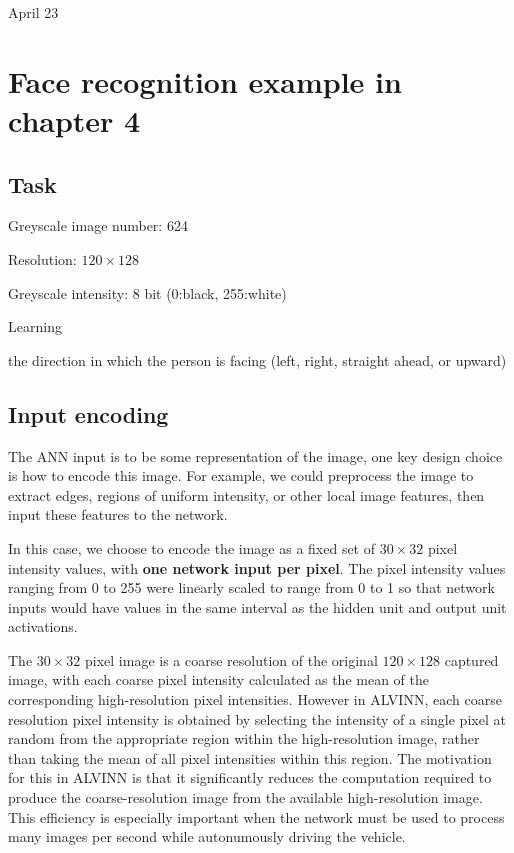 \univlogo

{\Huge April 23}\vspace{5mm}

\section*{Face recognition example in chapter 4}

\subsection*{Task}

Greyscale image number: 624

Resolution: $120 \times 128$

Greyscale intensity: 8 bit (0:black, 255:white)

\begin{LARGE}Learning\end{LARGE} the direction in which the person is facing (left, right, straight ahead, or upward)

\subsection*{Input encoding}

The ANN input is to be some representation of the image, one key design choice is how to encode this image. For example, we could preprocess the image to extract edges, regions of uniform intensity, or other local image features, then input these features to the network.

In this case, we choose to encode the image as a fixed set of $30 \times 32$ pixel intensity values, with \textbf{one network input per pixel}. The pixel intensity values ranging from 0 to 255 were linearly scaled to range from 0 to 1 so that network inputs would have values in the same interval as the hidden unit and output unit activations.

The $30 \times 32$ pixel image is a coarse resolution of the original $120 \times 128$ captured image, with each coarse pixel intensity calculated as the mean of the corresponding high-resolution pixel intensities. However in ALVINN, each coarse resolution pixel intensity is obtained by selecting the intensity of a single pixel at random from the appropriate region within the high-resolution image, rather than taking the mean of all pixel intensities within this region. The motivation for this in ALVINN is that it significantly reduces the computation required to produce the coarse-resolution image from the available high-resolution image. This efficiency is especially important when the network must be used to process many images per second while autonumously driving the vehicle.

